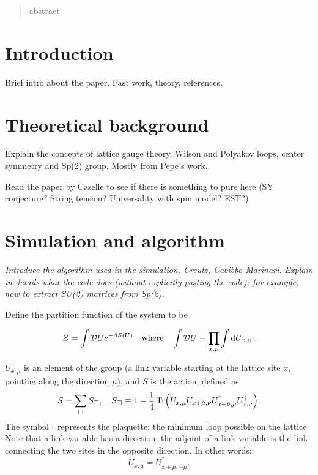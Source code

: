 \documentclass[reqno,12pt]{article}
\title{}
\date{}
\author{}
\numberwithin{equation}{section}
\begin{document}
\begin{abstract}
	abstract
\end{abstract}

\section{Introduction}
Brief intro about the paper. Past work, theory, references.


\section{Theoretical background}
Explain the concepts of lattice gauge theory, Wilson and Polyakov loops, center symmetry and Sp(2) group. 
Mostly from Pepe's work.

Read the paper by Caselle to see if there is something to pure here (SY conjecture? String tension? 
Universality with spin model? EST?)

\section{Simulation and algorithm}
\begin{center}
	\textit{Introduce the algorithm used in the simulation. Creutz, Cabibbo Marinari. Explain in details what the code
	does (without explicitly pasting the code): for example, how to extract SU(2) matrices from Sp(2).}
\end{center}

Define the partition function of the system to be

\begin{equation}
	\mathcal{Z} = \int \mathcal{D}U e^{-\beta S(U)} \qq{where} \int \mathcal{D} U \equiv \prod_{x,\mu} \int \dd{U_{x,\mu}}.
\end{equation}

$U_{x,\mu}$ is an element of the group (a link variable starting at the lattice site $x$, pointing
along the direction $\mu$), 
and $S$ is the action, defined as
\begin{equation}
	S = \sum_\square S_\square \qc 
	S_\square \equiv 1 - \frac{1}{4} \Tr(U_{x,\mu}U_{x+\hat{\mu}, \nu}U^\dagger_{x+\hat{\nu}, \mu}U^\dagger_{x,\nu}).
\end{equation}
The symbol $\square$ represents the plaquette: the minimum loop possible on the lattice. Note that a link 
variable has a direction: the adjoint of a link variable is the link connecting the two sites in the opposite
direction. In other words:
\begin{equation}
	U_{x,\mu} = U_{x+\hat{\mu}, -\mu}^\dagger.
\end{equation}
\end{document}
